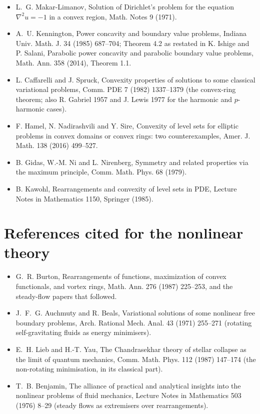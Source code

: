 \documentclass[11pt]{article}
\theoremstyle{definition}
\theoremstyle{remark}
\begin{document}
\begin{itemize}\small
\item L.~G. Makar-Limanov, Solution of Dirichlet's problem for the
  equation $\nabla^2 u = -1$ in a convex region, Math. Notes 9 (1971).
\item A.~U. Kennington, Power concavity and boundary value problems,
  Indiana Univ. Math. J. 34 (1985) 687--704; Theorem 4.2 as restated
  in K. Ishige and P. Salani, Parabolic power concavity and parabolic
  boundary value problems, Math. Ann. 358 (2014), Theorem 1.1.
\item L. Caffarelli and J. Spruck, Convexity properties of solutions
  to some classical variational problems, Comm. PDE 7 (1982)
  1337--1379 (the convex-ring theorem; also R. Gabriel 1957 and
  J. Lewis 1977 for the harmonic and $p$-harmonic cases).
\item F. Hamel, N. Nadirashvili and Y. Sire, Convexity of level sets
  for elliptic problems in convex domains or convex rings: two
  counterexamples, Amer. J. Math. 138 (2016) 499--527.
\item B. Gidas, W.-M. Ni and L. Nirenberg, Symmetry and related
  properties via the maximum principle, Comm. Math. Phys. 68 (1979).
\item B. Kawohl, Rearrangements and convexity of level sets in PDE,
  Lecture Notes in Mathematics 1150, Springer (1985).
\end{itemize}

\section*{References cited for the nonlinear theory}

\begin{itemize}\small
\item G.~R. Burton, Rearrangements of functions, maximization of
  convex functionals, and vortex rings, Math. Ann. 276 (1987)
  225--253, and the steady-flow papers that followed.
\item J.~F.~G. Auchmuty and R. Beals, Variational solutions of some
  nonlinear free boundary problems, Arch. Rational Mech. Anal. 43
  (1971) 255--271 (rotating self-gravitating fluids as energy
  minimisers).
\item E.~H. Lieb and H.-T. Yau, The Chandrasekhar theory of stellar
  collapse as the limit of quantum mechanics, Comm. Math. Phys. 112
  (1987) 147--174 (the non-rotating minimisation, in its classical
  part).
\item T.~B. Benjamin, The alliance of practical and analytical
  insights into the nonlinear problems of fluid mechanics, Lecture
  Notes in Mathematics 503 (1976) 8--29 (steady flows as extremisers
  over rearrangements).
\end{itemize}
\end{document}
